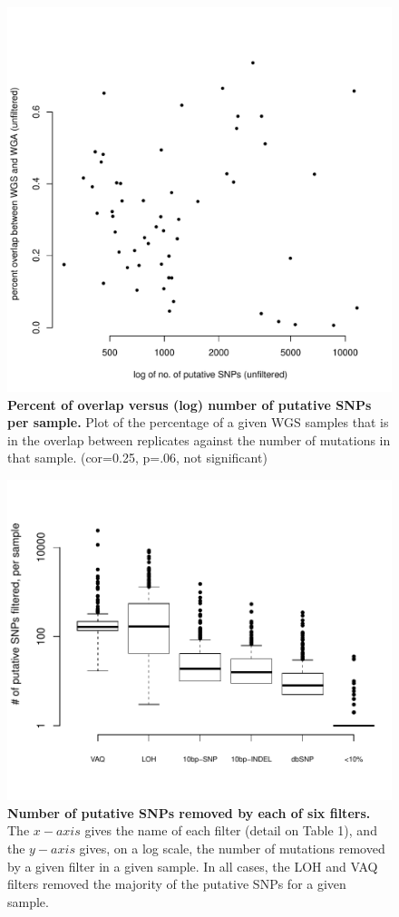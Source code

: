 \documentclass[11pt]{article} %
\begin{document}
\begin{figure}
\centerline{
\includegraphics[width=5in]{unfiltered_total_muts_v_percent_overlap.pdf} }
\caption{\textbf{Percent of overlap versus (log) number of putative SNPs per sample.} Plot of the percentage of a given WGS samples that is in the overlap between replicates against the number of mutations in that sample. (cor=0.25, p=.06, not significant)}
\label{fig:unfiltered_total_muts}
\end{figure}

\begin{figure}
\centerline{
\includegraphics[width=6in]{boxplot_number_filtered.pdf} }
\caption{\textbf{Number of putative SNPs removed by each of six filters.} The $x-axis$ gives the name of each filter (detail on Table 1), and the $y-axis$ gives, on a log scale, the number of mutations removed by a given filter in a given sample. In all cases, the LOH and VAQ filters removed the majority of the putative SNPs for a given sample.}
\label{fig:boxplot_number_filtered}
\end{figure}
\end{document}
